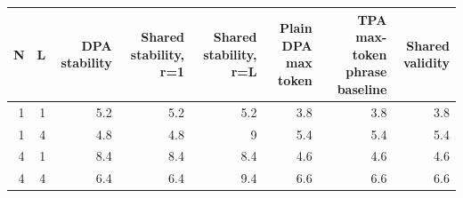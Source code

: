 \begin{tabular}{rrrrrrrr}
\toprule
N & L & DPA stability & Shared stability, r=1 & Shared stability, r=L & Plain DPA max token & TPA max-token phrase baseline & Shared validity \\
\midrule
1 & 1 & 5.2 & 5.2 & 5.2 & 3.8 & 3.8 & 3.8 \\
1 & 4 & 4.8 & 4.8 & 9 & 5.4 & 5.4 & 5.4 \\
4 & 1 & 8.4 & 8.4 & 8.4 & 4.6 & 4.6 & 4.6 \\
4 & 4 & 6.4 & 6.4 & 9.4 & 6.6 & 6.6 & 6.6 \\
\bottomrule
\end{tabular}
